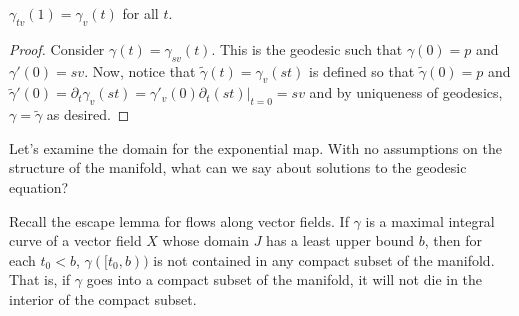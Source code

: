 \documentclass[../main.tex]{subfiles}
\begin{document}
\begin{lemma}
    $\gamma_{tv}(1) = \gamma_v(t)$ for all $t$. 
\end{lemma}
\begin{proof}
    Consider $\gamma(t) = \gamma_{sv}(t)$. This is the geodesic such that
    $\gamma(0)=p$ and $\gamma'(0)=sv$. Now, notice that $\tilde{\gamma}(t) =
    \gamma_v(st)$ is defined so that $\tilde{\gamma}(0)=p$ and
    $\tilde{\gamma}'(0) = \partial_t\gamma_v(st) =
    \gamma'_v(0)\partial_t(st)|_{t=0} = sv$ and by uniqueness of geodesics,
    $\gamma = \tilde{\gamma}$ as desired.
\end{proof}

Let's examine the domain for the exponential map. With no assumptions on the
structure of the manifold, what can we say about solutions to the geodesic
equation?

Recall the escape lemma for flows along vector fields. If $\gamma$ is a maximal
integral curve of a vector field $X$ whose domain $J$ has a least upper bound
$b$, then for each $t_0<b$, $\gamma([t_0,b))$ is not contained in any compact
subset of the manifold. That is, if $\gamma$ goes into a compact subset of the
manifold, it will not die in the interior of the compact subset.
\end{document}
